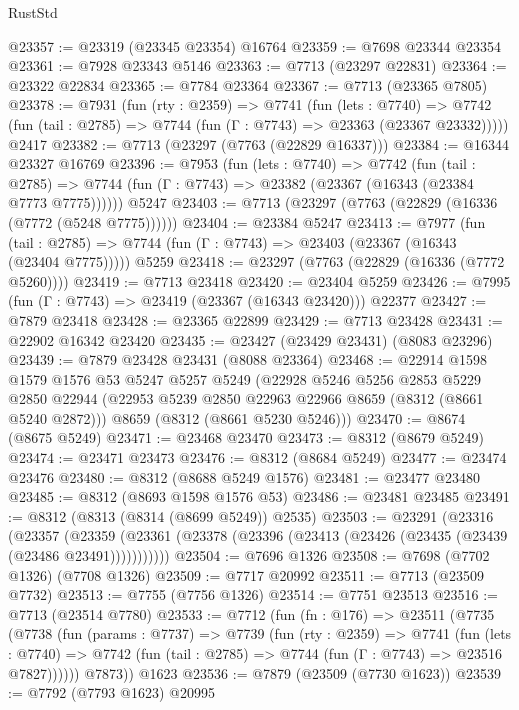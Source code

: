 \begin{lexlean}{RustStd}
\begin{coremodule}
@23357 := @23319 (@23345 @23354) @16764
@23359 := @7698 @23344 @23354
@23361 := @7928 @23343 @5146
@23363 := @7713 (@23297 @22831)
@23364 := @23322 @22834
@23365 := @7784 @23364
@23367 := @7713 (@23365 @7805)
@23378 := @7931
    (fun (rty : @2359) =>
    @7741
      (fun (lets : @7740) =>
      @7742 (fun (tail : @2785) => @7744 (fun (Γ : @7743) => @23363 (@23367 @23332)))))
    @2417
@23382 := @7713 (@23297 (@7763 (@22829 @16337)))
@23384 := @16344 @23327 @16769
@23396 := @7953
    (fun (lets : @7740) =>
    @7742
      (fun (tail : @2785) =>
      @7744 (fun (Γ : @7743) => @23382 (@23367 (@16343 (@23384 @7773 @7775))))))
    @5247
@23403 := @7713 (@23297 (@7763 (@22829 (@16336 (@7772 (@5248 @7775))))))
@23404 := @23384 @5247
@23413 := @7977
    (fun (tail : @2785) => @7744 (fun (Γ : @7743) => @23403 (@23367 (@16343 (@23404 @7775)))))
    @5259
@23418 := @23297 (@7763 (@22829 (@16336 (@7772 @5260))))
@23419 := @7713 @23418
@23420 := @23404 @5259
@23426 := @7995 (fun (Γ : @7743) => @23419 (@23367 (@16343 @23420))) @22377
@23427 := @7879 @23418
@23428 := @23365 @22899
@23429 := @7713 @23428
@23431 := @22902 @16342 @23420
@23435 := @23427 (@23429 @23431) (@8083 @23296)
@23439 := @7879 @23428 @23431 (@8088 @23364)
@23468 := @22914
    @1598
    @1579
    @1576
    @53
    @5247
    @5257
    @5249
    (@22928
      @5246
      @5256
      @2853
      @5229
      @2850
      @22944
      (@22953 @5239 @2850 @22963 @22966 @8659 (@8312 (@8661 @5240 @2872)))
      @8659
      (@8312 (@8661 @5230 @5246)))
@23470 := @8674 (@8675 @5249)
@23471 := @23468 @23470
@23473 := @8312 (@8679 @5249)
@23474 := @23471 @23473
@23476 := @8312 (@8684 @5249)
@23477 := @23474 @23476
@23480 := @8312 (@8688 @5249 @1576)
@23481 := @23477 @23480
@23485 := @8312 (@8693 @1598 @1576 @53)
@23486 := @23481 @23485
@23491 := @8312 (@8313 (@8314 (@8699 @5249)) @2535)
@23503 := @23291
    (@23316
      (@23357
        (@23359 (@23361 (@23378 (@23396 (@23413 (@23426 (@23435 (@23439 (@23486 @23491)))))))))))
@23504 := @7696 @1326
@23508 := @7698 (@7702 @1326) (@7708 @1326)
@23509 := @7717 @20992
@23511 := @7713 (@23509 @7732)
@23513 := @7755 (@7756 @1326)
@23514 := @7751 @23513
@23516 := @7713 (@23514 @7780)
@23533 := @7712
    (fun (fn : @176) =>
    @23511
      (@7735
        (@7738
          (fun (params : @7737) =>
          @7739
            (fun (rty : @2359) =>
            @7741
              (fun (lets : @7740) =>
              @7742 (fun (tail : @2785) => @7744 (fun (Γ : @7743) => @23516 @7827))))))
        @7873))
    @1623
@23536 := @7879 (@23509 (@7730 @1623))
@23539 := @7792 (@7793 @1623) @20995

\end{coremodule}
\end{lexlean}
